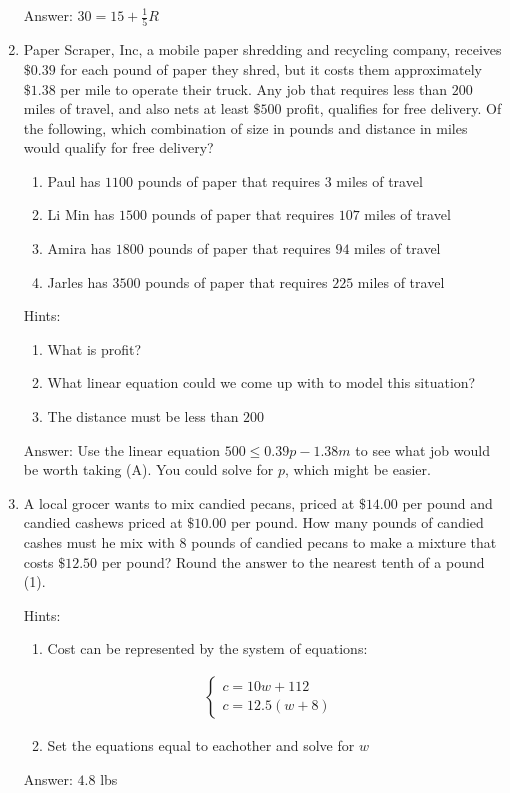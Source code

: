 \documentclass{article}
\begin{document}
\begin{enumerate}
{	      Answer: \(30=15+\frac{1}{5}R\)
	      }

	\item{Paper Scraper, Inc, a mobile paper shredding and recycling company, receives $\$0.39$ for each pound of paper they shred, but it costs them approximately $\$1.38$ per mile to operate their truck. Any job that requires less than $200$ miles of travel, and also nets at least $\$500$ profit, qualifies for free delivery. Of the following, which combination of size in pounds and distance in miles would qualify for free delivery?

		      \begin{enumerate}
			      \item {Paul has $1100$ pounds of paper that requires $3$ miles of travel}
			      \item {Li Min has $1500$ pounds of paper that requires $107$ miles of travel}
			      \item {Amira has $1800$ pounds of paper that requires $94$ miles of travel}
			      \item {Jarles has $3500$ pounds of paper that requires $225$ miles of travel}
		      \end{enumerate}

		      Hints:
		      \begin{enumerate}
			      \item{What is profit?}
			      \item{What linear equation could we come up with to model this situation?}
			      \item{The distance must be less than $200$}
		      \end{enumerate}

		      Answer: Use the linear equation \(500\leq 0.39p - 1.38m\) to see what job would be worth taking (A). You could solve for $p$, which might be easier.
	      }

	\item {A local grocer wants to mix candied pecans, priced at $\$14.00$ per pound and candied cashews priced at $\$10.00$ per pound. How many pounds of candied cashes must he mix with $8$ pounds of candied pecans to make a mixture that costs $\$12.50$ per pound? Round the answer to the nearest tenth of a pound (1).

		      Hints:
		      \begin{enumerate}
			      \item{Cost can be represented by the system of equations:

			            \[
				            \begin{array}{l}
					            \begin{cases}
						            c=10w+112 & \\
						            c=12.5(w+8)
					            \end{cases}
				            \end{array}
			            \]
			            }
			      \item {Set the equations equal to eachother and solve for $w$}
		      \end{enumerate}
		      Answer: $4.8$ lbs
	      }


\end{enumerate}
\end{document}
